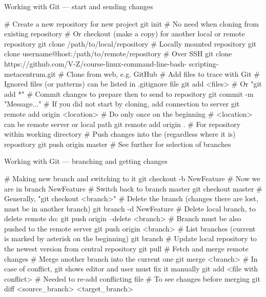 \documentclass[compress, ucs, xelatex, 11pt, xcolor=svgnames,
  hyperref={
    bookmarks=true,
    unicode=true,
    colorlinks=true,
    pdftitle={Linux, command line and MetaCentrum},
    plainpages=false,
    pdfauthor={Vojtech Zeisek},
    pdfsubject={Course about use of Linux command line, writing shell scripts and using MetaCentrum of CESNET},
    pdfcreator={XeLaTeX},
    pdfkeywords={Linux, GNU, BASH, shell, command line, MetaCentrum},
    linkcolor=DarkRed,
    anchorcolor=DarkBlue,
    citecolor=Indigo,
    filecolor=NavyBlue,
    menucolor=DarkMagenta,
    urlcolor=DarkBlue,
    pdftex},
  url={hyphens, lowtilde} %
  ]{beamer}
\begin{document}
\begin{frame}[fragile]{Working with Git --- start and sending changes}
  \begin{bashcode}
    # Create a new repository for new project
    git init # No need when cloning from existing repository
    # Or checkout (make a copy) for another local or remote repository
    git clone /path/to/local/repository # Locally mounted repository
    git clone username@host:/path/to/remote/repository # Over SSH
    git clone https://github.com/V-Z/course-linux-command-line-bash-
      scripting-metacentrum.git # Clone from web, e.g. GitHub
    # Add files to trace with Git
    # Ignored files (or patterns) can be listed in .gitignore file
    git add <files> # Or "git add *"
    # Commit changes to prepare then to send to repository
    git commit -m "Message..."
    # If you did not start by cloning, add connection to server
    git remote add origin <location> # Do only once on the beginning
    # <location> can be remote server or local path
    git remote add origin . # For repository within working directory
    # Push changes into the (regardless where it is) repository
    git push origin master # See further for selection of branches
  \end{bashcode}
\end{frame}

\begin{frame}[fragile]{Working with Git --- branching and getting changes}
  \begin{bashcode}
    # Making new branch and switching to it
    git checkout -b NewFeature # Now we are in branch NewFeature
    # Switch back to branch master
    git checkout master # Generally, "git checkout <branch>"
    # Delete the branch (changes there are lost, must be in another branch)
    git branch -d NewFeature # Delete local branch, to delete remote do:
    git push origin --delete <branch>
    # Branch must be also pushed to the remote server
    git push origin <branch>
    # List branches (current is marked by asterisk on the beginning)
    git branch
    # Update local repository to the newest version from central repository
    git pull # Fetch and merge remote changes
    # Merge another branch into the current one
    git merge <branch>
    # In case of conflict, git shows editor and user must fix it manually
    git add <file with conflict> # Needed to re-add conflicting file
    # To see changes before merging
    git diff <source_branch> <target_branch>
  \end{bashcode}
\end{frame}
\end{document}
